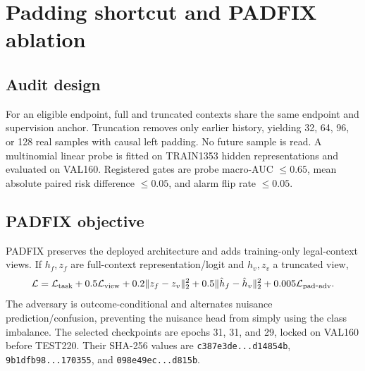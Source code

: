 \documentclass[10pt]{article}
\newcommand{\code}[1]{\nolinkurl{#1}}
\begin{document}
\section{Padding shortcut and PADFIX ablation}

\subsection{Audit design}

For an eligible endpoint, full and truncated contexts share the same endpoint and supervision anchor.  Truncation removes only earlier history, yielding 32, 64, 96, or 128 real samples with causal left padding.  No future sample is read.  A multinomial linear probe is fitted on TRAIN1353 hidden representations and evaluated on VAL160.  Registered gates are probe macro-AUC $\leq0.65$, mean absolute paired risk difference $\leq0.05$, and alarm flip rate $\leq0.05$.

\begin{table}[h]
\centering
\small

\caption{Primary versus PADFIX.  Probe/risk/flip are VAL160 same-endpoint audits; source metrics are from the count-aligned TEST220 comparator.}
\end{table}

\subsection{PADFIX objective}

PADFIX preserves the deployed architecture and adds training-only legal-context views.  If $h_f,z_f$ are full-context representation/logit and $h_v,z_v$ a truncated view,
\begin{equation}
\mathcal{L}=\mathcal{L}_{\rm task}
+0.5\mathcal{L}_{\rm view}
+0.2\|z_f-z_v\|_2^2
+0.5\|\hat h_f-\hat h_v\|_2^2
+0.005\mathcal{L}_{\rm pad\mbox{-}adv}.
\end{equation}
The adversary is outcome-conditional and alternates nuisance prediction/confusion, preventing the nuisance head from simply using the class imbalance.  The selected checkpoints are epochs 31, 31, and 29, locked on VAL160 before TEST220.  Their SHA-256 values are \code{c387e3de...d14854b}, \code{9b1dfb98...170355}, and \code{098e49ec...d815b}.

\begin{table}[h]
\centering

\caption{PADFIX parent under the previously frozen target and v3c policies.  Online FPR increases for every seed, so this is a negative-transfer ablation.}
\end{table}
\end{document}
